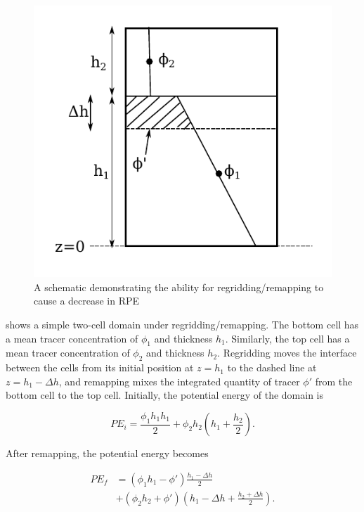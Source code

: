 
\begin{figure}
  \includegraphics{../plots/schematic.pdf}
  \caption{\label{fig:schematic} A schematic demonstrating the ability for regridding/remapping to cause a decrease in RPE}
\end{figure}

 shows a simple two-cell domain under regridding/remapping. The bottom cell has a mean tracer concentration of $\phi_1$ and thickness $h_1$. Similarly, the top cell has a mean tracer concentration of $\phi_2$ and thickness $h_2$. Regridding moves the interface between the cells from its initial position at $z = h_1$ to the dashed line at $z = h_1 - \Delta h$, and remapping mixes the integrated quantity of tracer $\phi'$ from the bottom cell to the top cell. Initially, the potential energy of the domain is

\begin{equation}
  PE_i = \frac{\phi_1 h_1 h_1}{2} + \phi_2 h_2\left(h_1 + \frac{h_2}{2}\right).
\end{equation}

After remapping, the potential energy becomes

\begin{equation}
  \begin{split}
    PE_f &= \left(\phi_1 h_1 - \phi'\right)\frac{h_1 - \Delta h}{2} \\
    &+ \left(\phi_2 h_2 + \phi'\right)\left(h_1 - \Delta h + \frac{h_2 + \Delta h}{2}\right).
  \end{split}
\end{equation}

